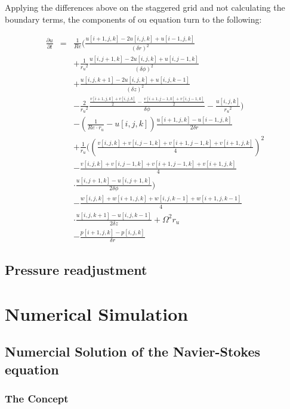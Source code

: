 \documentclass[12pt, a4paper, twoside]{article}
\begin{document}
		Applying the differences above on the staggered grid and not calculating the boundary terms, the components of ou equation turn to the following:
		
		\begin{eqnarray}
			\frac{\partial u}{\partial t} &=& \frac{1}{Re}\bigg(\frac{u[i+1,j,k]-2u[i,j,k]+u[i-1,j,k]}{(\delta r)^2}
			\nonumber \\
			&& + \frac{1}{{r_u}^2}\frac{u[i,j+1,k]-2u[i,j,k]+u[i,j-1,k]}{(\delta \phi)^2}
			\nonumber \\
			&& + \frac{u[i,j,k+1] - 2u[i,j,k] +u[i,j,k-1]}{(\delta z)^2}
			\nonumber \\
			&& - \frac{2}{{r_u}^2}\frac{\frac{v[i+1,j,k]+v[i,j,k]}{2}-\frac{v[i+1,j-1,k]+v[i,j-1,k]}{2}}{\delta \phi}
			- \frac{u[i,j,k]}{{r_u}^2}\bigg)
			\nonumber \\
			&& - \left(\frac{1}{Re\cdot r_u} - u[i,j,k]\right)\frac{u[i+1,j,k]-u[i-1,j,k]}{2\delta r}
			\nonumber \\
			&& + \frac{1}{r_u}\Bigg(\left(\frac{v[i,j,k]+v[i,j-1,k]+v[i+1,j-1,k]+v[i+1,j,k]}{4}\right)^2
			\nonumber \\
			&& - \frac{v[i,j,k]+v[i,j-1,k]+v[i+1,j-1,k]+v[i+1,j,k]}{4}
			\nonumber \\
			&&\cdot \frac{u[i,j+1,k]-u[i,j+1,k]}{2\delta \phi}\Bigg)
			\nonumber \\
			&& - \frac{w[i,j,k]+w[i+1,j,k]+w[i,j,k-1]+w[i+1,j,k-1]}{4}
			\nonumber \\
			&&\cdot \frac{u[i,j,k+1]-u[i,j,k-1]}{2\delta z} + \Omega^2 r_u
			\nonumber \\
			&& - \frac{p[i+1,j,k]-p[i,j,k]}{\delta r}
		\end{eqnarray}
		
	\subsection{Pressure readjustment}

	\newpage
\section{Numerical Simulation}
	\subsection{Numercial Solution of the Navier-Stokes equation}
		\subsubsection{The Concept}
		
\end{document}
